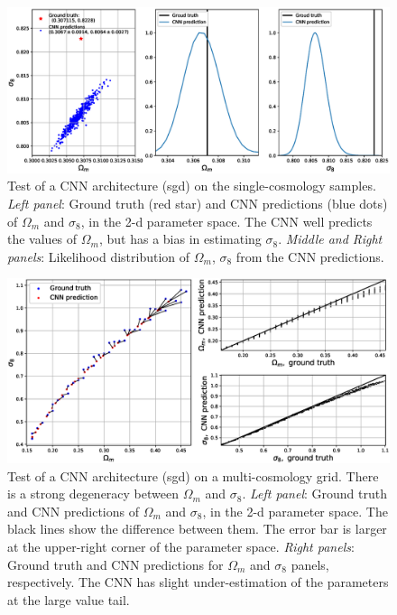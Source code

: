 \documentclass[twocolumn]{aastex61}
\begin{document}
\begin{figure}
   \centering
    \includegraphics[width=16cm]{bigmd_rlt.eps}
   \caption{\label{single_cosmology}
   Test of a CNN architecture (sgd) on the single-cosmology samples.
   {\it Left panel}: Ground truth (red star) and CNN predictions (blue dots) of $\Omega_m$ and $\sigma_8$, in the 2-d parameter space.
   The CNN well predicts the values of $\Omega_m$, but has a bias in estimating $\sigma_8$.
   {\it Middle and Right panels}: Likelihood distribution of $\Omega_m$, $\sigma_8$ from the CNN predictions.
   }
\end{figure}

\begin{figure}
   \centering
    \includegraphics[width=16cm]{multi_cosmology.eps}
   \caption{\label{multi_cosmology}
   Test of a CNN architecture (sgd) on a multi-cosmology grid.
   There is a strong degeneracy between $\Omega_m$ and $\sigma_8$.
   {\it Left panel}: Ground truth and CNN predictions of $\Omega_m$ and $\sigma_8$, in the 2-d parameter space.
   The black lines show the difference between them.
   The error bar is larger at the upper-right corner of the parameter space.
   {\it Right panels}: Ground truth and CNN predictions for $\Omega_m$ and $\sigma_8$ panels, respectively.
   The CNN has slight under-estimation of the parameters at the large value tail.
   }
\end{figure}
\end{document}
